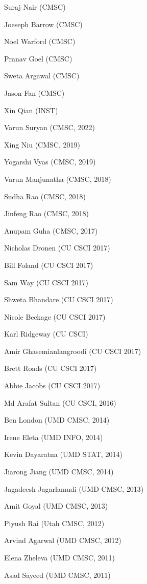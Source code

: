 {{  \begin{enumerate*}
    \item Suraj Nair (CMSC)  
  \item Joeseph Barrow (CMSC)
  \item Noel Warford (CMSC)
  \item Pranav Goel (CMSC)
    \item Sweta Argawal (CMSC)
    \item Jason Fan (CMSC)
    \item Xin Qian (INST)    
    \item Varun Suryan (CMSC, 2022)
\item Xing Niu (CMSC, 2019)
\item Yogarshi Vyas (CMSC, 2019)
\item Varun Manjunatha (CMSC, 2018)
\item Sudha Rao (CMSC, 2018)
\item Jinfeng Rao (CMSC, 2018)
\item Anupam Guha (CMSC, 2017)
\item Nicholas Dronen (CU CSCI 2017)
\item Bill Foland (CU CSCI 2017)
\item Sam Way (CU CSCI 2017)
\item Shweta Bhandare (CU CSCI 2017)
\item Nicole Beckage (CU CSCI 2017)
\item Karl Ridgeway (CU CSCI)
\item Amir Ghasemianlangroodi (CU CSCI 2017)
\item Brett Roads (CU CSCI 2017)
\item Abbie Jacobs (CU CSCI 2017)
\item Md Arafat Sultan (CU CSCI, 2016)
\item Ben London (UMD CMSC, 2014)
\item Irene Eleta (UMD INFO, 2014)
\item Kevin Dayaratna (UMD STAT, 2014)
\item Jiarong Jiang (UMD CMSC, 2014)
\item Jagadeesh Jagarlamudi (UMD CMSC, 2013)
\item Amit Goyal (UMD CMSC, 2013)
\item Piyush Rai (Utah CMSC, 2012)
\item Arvind Agarwal (UMD CMSC, 2012)
\item Elena Zheleva (UMD CMSC, 2011)
\item Asad Sayeed (UMD CMSC, 2011)
\end{enumerate*}
}
}

